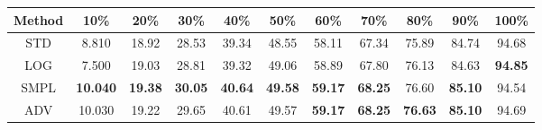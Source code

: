 \documentclass{standalone}
\begin{document}
\begin{tabular}{c|cccccccccc}
      \toprule
      Method & 10\% & 20\% & 30\% & 40\% & 50\% & 60\% & 70\% & 80\% & 90\% & 100\% \\
      \midrule
STD & 8.810 & 18.92 & 28.53 & 39.34 & 48.55 & 58.11 & 67.34 & 75.89 & 84.74 & 94.68\\
LOG & 7.500 & 19.03 & 28.81 & 39.32 & 49.06 & 58.89 & 67.80 & 76.13 & 84.63 & \textbf{94.85}\\
SMPL & \textbf{10.040} & \textbf{19.38} & \textbf{30.05} & \textbf{40.64} & \textbf{49.58} & \textbf{59.17} & \textbf{68.25} & 76.60 & \textbf{85.10} & 94.54\\
ADV & 10.030 & 19.22 & 29.65 & 40.61 & 49.57 & \textbf{59.17} & \textbf{68.25} & \textbf{76.63} & \textbf{85.10} & 94.69\\
  \bottomrule
\end{tabular}
\end{document}
